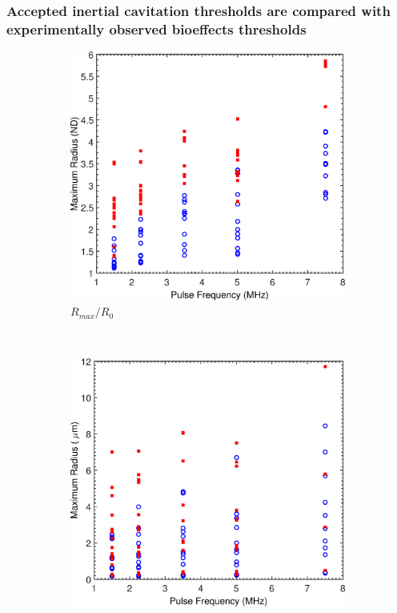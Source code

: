 \begin{frame}
  \frametitle{Accepted inertial cavitation thresholds are compared with experimentally observed
    bioeffects thresholds}

  \begin{figure}
    \centering
    \begin{subfigure}{0.43\textwidth}
      \includegraphics[width=\textwidth]{../figs/bubble_figs/Rstarmax_F}
      \caption[Dependence of maximum dimensionless bubble radius on pulse frequency]{$R_{max}/R_0$}
      \label{fig:usbe_bubble_ndradius_frequency}
    \end{subfigure}  
    ~
    \begin{subfigure}{0.43\textwidth}
      \includegraphics[width=\textwidth]{../figs/bubble_figs/rmax_F}

\end{subfigure}
\end{figure}
\end{frame}
